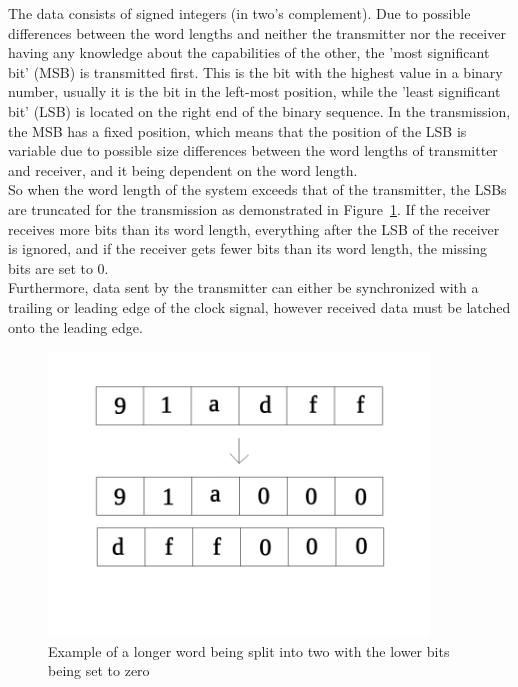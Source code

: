 The data consists of signed integers (in two's complement).
Due to possible differences between the word lengths and neither the transmitter nor the
receiver having any knowledge about the capabilities of the other, the 'most significant bit' (MSB) is transmitted first.
This is the bit with the highest value in a binary number, usually it is the bit in the left-most position,
while the 'least significant bit' (LSB) is located on the right end of the binary sequence.
In the transmission, the MSB has a fixed position, which means that the position of the LSB
is variable due to possible size differences between the word lengths of transmitter and receiver,
and it being dependent on the word length.\\
So when the word length of the system exceeds that of the transmitter, the LSBs are truncated
for the transmission as demonstrated in Figure~\ref{fig:truncation}.
If the receiver receives more bits than its word length, everything after the LSB
of the receiver is ignored, and if the receiver gets fewer bits than its word length,
the missing bits are set to 0.\\
Furthermore, data sent by the transmitter can either be synchronized with a trailing or leading edge
of the clock signal, however received data must be latched onto the leading edge.


\begin{figure}[htb]
    \centering
    \includegraphics[width=0.9\textwidth]{figures/fundamentals_truncation.png}
    \caption[Illustration: Truncation of words]{Example of a longer word being split into two with the lower bits being set to zero}
    \label{fig:truncation}
\end{figure}

